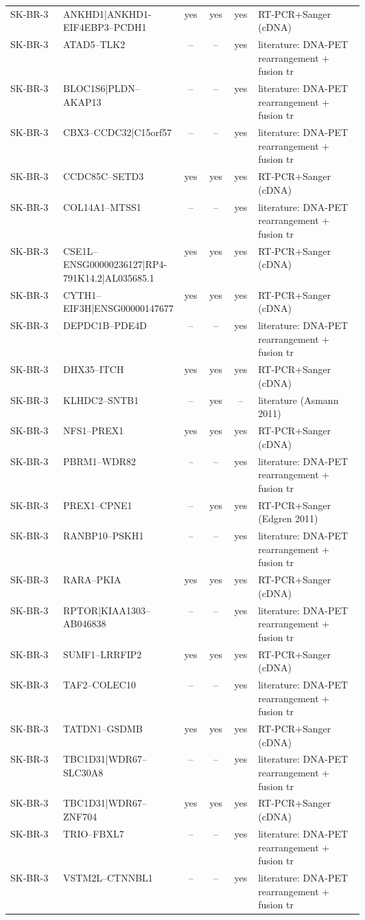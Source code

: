 {\begin{longtable}{lp{0.30\linewidth}cccp{0.30\linewidth}}
SK-BR-3 & ANKHD1|ANKHD1-EIF4EBP3--PCDH1 & yes & yes & yes & RT-PCR+Sanger (cDNA) \\
SK-BR-3 & ATAD5--TLK2 & -- & -- & yes & literature: DNA-PET rearrangement + fusion tr \\
SK-BR-3 & BLOC1S6|PLDN--AKAP13 & -- & -- & yes & literature: DNA-PET rearrangement + fusion tr \\
SK-BR-3 & CBX3--CCDC32|C15orf57 & -- & -- & yes & literature: DNA-PET rearrangement + fusion tr \\
SK-BR-3 & CCDC85C--SETD3 & yes & yes & yes & RT-PCR+Sanger (cDNA) \\
SK-BR-3 & COL14A1--MTSS1 & -- & -- & yes & literature: DNA-PET rearrangement + fusion tr \\
SK-BR-3 & CSE1L--ENSG00000236127|RP4-791K14.2|AL035685.1 & yes & yes & yes & RT-PCR+Sanger (cDNA) \\
SK-BR-3 & CYTH1--EIF3H|ENSG00000147677 & yes & yes & yes & RT-PCR+Sanger (cDNA) \\
SK-BR-3 & DEPDC1B--PDE4D & -- & -- & yes & literature: DNA-PET rearrangement + fusion tr \\
SK-BR-3 & DHX35--ITCH & yes & yes & yes & RT-PCR+Sanger (cDNA) \\
SK-BR-3 & KLHDC2--SNTB1 & -- & yes & -- & literature (Asmann 2011) \\
SK-BR-3 & NFS1--PREX1 & yes & yes & yes & RT-PCR+Sanger (cDNA) \\
SK-BR-3 & PBRM1--WDR82 & -- & -- & yes & literature: DNA-PET rearrangement + fusion tr \\
SK-BR-3 & PREX1--CPNE1 & -- & yes & yes & RT-PCR+Sanger (Edgren 2011) \\
SK-BR-3 & RANBP10--PSKH1 & -- & -- & yes & literature: DNA-PET rearrangement + fusion tr \\
SK-BR-3 & RARA--PKIA & yes & yes & yes & RT-PCR+Sanger (cDNA) \\
SK-BR-3 & RPTOR|KIAA1303--AB046838 & -- & -- & yes & literature: DNA-PET rearrangement + fusion tr \\
SK-BR-3 & SUMF1--LRRFIP2 & yes & yes & yes & RT-PCR+Sanger (cDNA) \\
SK-BR-3 & TAF2--COLEC10 & -- & -- & yes & literature: DNA-PET rearrangement + fusion tr \\
SK-BR-3 & TATDN1--GSDMB & yes & yes & yes & RT-PCR+Sanger (cDNA) \\
SK-BR-3 & TBC1D31|WDR67--SLC30A8 & -- & -- & yes & literature: DNA-PET rearrangement + fusion tr \\
SK-BR-3 & TBC1D31|WDR67--ZNF704 & yes & yes & yes & RT-PCR+Sanger (cDNA) \\
SK-BR-3 & TRIO--FBXL7 & -- & -- & yes & literature: DNA-PET rearrangement + fusion tr \\
SK-BR-3 & VSTM2L--CTNNBL1 & -- & -- & yes & literature: DNA-PET rearrangement + fusion tr \\
\bottomrule
\end{longtable}
}
